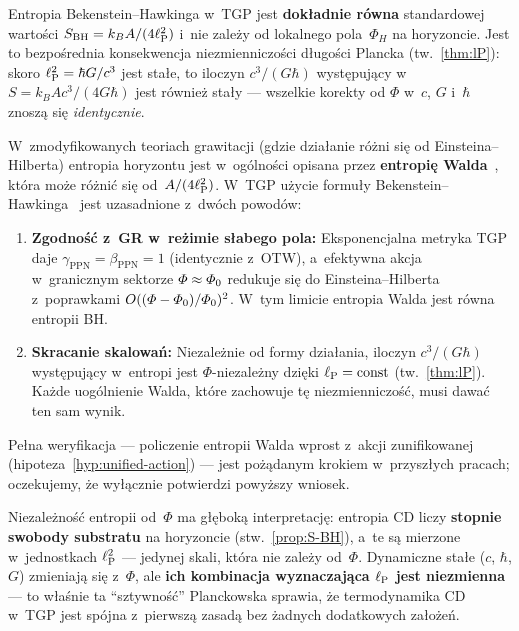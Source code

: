 \begin{corollary}\label{cor:S-Phi-independent}
Entropia Bekenstein--Hawkinga w~TGP jest
\textbf{dok\l{}adnie r\'owna} standardowej warto\'sci
$S_{\mathrm{BH}} = k_B A/(4\ell_{\mathrm{P}}^2)$ i~nie zale\.zy od
lokalnego pola~$\Phi_H$ na horyzoncie.
Jest to bezpo\'srednia konsekwencja niezmienniczo\'sci
d\l{}ugo\'sci Plancka (tw.~\ref{thm:lP}): skoro
$\ell_{\mathrm{P}}^2 = \hbar G/c^3$ jest sta\l{}e, to iloczyn
$c^3/(G\hbar)$ wyst\k{e}puj\k{a}cy w~$S = k_B Ac^3/(4G\hbar)$
jest r\'ownie\.z sta\l{}y --- wszelkie korekty od $\Phi$
w~$c$, $G$ i~$\hbar$ znosz\k{a} si\k{e} \emph{identycznie}.
\end{corollary}

\begin{remark}\label{rem:wald-entropy}
W~zmodyfikowanych teoriach grawitacji (gdzie dzia\l{}anie r\'o\.zni
si\k{e} od Einsteina--Hilberta) entropia horyzontu jest w~og\'olno\'sci
opisana przez \textbf{entropi\k{e} Walda}~\cite{Wald1993}, kt\'ora mo\.ze r\'o\.zni\'c
si\k{e} od~$A/(4\ell_{\mathrm{P}}^2)$. W~TGP u\.zycie formu\l{}y
Bekenstein--Hawkinga~\cite{Bekenstein1973,Hawking1975} jest uzasadnione z~dw\'och powod\'ow:
\begin{enumerate}[nosep]
  \item \textbf{Zgodno\'s\'c z~GR w~re\.zimie s\l{}abego pola:}
    Eksponencjalna metryka TGP daje $\gamma_{\mathrm{PPN}}=\beta_{\mathrm{PPN}}=1$
    (identycznie z~OTW), a~efektywna akcja w~granicznym sektorze
    $\varPhi\approx\varPhi_0$ redukuje si\k{e} do Einsteina--Hilberta
    z~poprawkami $O((\varPhi-\varPhi_0)/\varPhi_0)^2$.
    W~tym limicie entropia Walda jest r\'owna entropii BH.
  \item \textbf{Skracanie skalowa\'n:}
    Niezale\.znie od formy dzia\l{}ania, iloczyn $c^3/(G\hbar)$
    wyst\k{e}puj\k{a}cy w~entropi jest $\Phi$-niezale\.zny
    dzi\k{e}ki $\ell_{\mathrm{P}}=\mathrm{const}$ (tw.~\ref{thm:lP}).
    Ka\.zde uog\'olnienie Walda, kt\'ore zachowuje t\k{e}
    niezmienniczo\'s\'c, musi dawa\'c ten sam wynik.
\end{enumerate}
Pe\l{}na weryfikacja --- policzenie entropii Walda wprost
z~akcji zunifikowanej (hipoteza~\ref{hyp:unified-action}) ---
jest po\.z\k{a}danym krokiem w~przysz\l{}ych pracach; oczekujemy,
\.ze wy\l{}\k{a}cznie potwierdzi powy\.zszy wniosek.
\end{remark}

\begin{remark}
Niezale\.zno\'s\'c entropii od~$\Phi$ ma g\l{}\k{e}bok\k{a}
interpretacj\k{e}: entropia CD liczy \textbf{stopnie swobody
substratu} na horyzoncie (stw.~\ref{prop:S-BH}), a~te s\k{a}
mierzone w~jednostkach $\ell_{\mathrm{P}}^2$ --- jedynej skali, kt\'ora
nie zale\.zy od~$\Phi$. Dynamiczne sta\l{}e ($c$, $\hbar$, $G$)
zmieniaj\k{a} si\k{e} z~$\Phi$, ale \textbf{ich kombinacja
wyznaczaj\k{a}ca $\ell_{\mathrm{P}}$ jest niezmienna} --- to w\l{}a\'snie
ta ``sztywno\'s\'c'' Planckowska sprawia, \.ze termodynamika CD
w~TGP jest sp\'ojna z~pierwsz\k{a} zasad\k{a} bez \.zadnych
dodatkowych za\l{}o\.ze\'n.
\end{remark}

